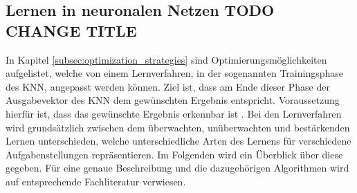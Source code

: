 \subsection{Lernen in neuronalen Netzen TODO CHANGE TITLE}
In Kapitel \ref{subsec:optimization_strategies} sind Optimierungsmöglichkeiten aufgelistet, welche von einem Lernverfahren, in der sogenannten Trainingsphase des \ac{KNN}, angepasst werden können. Ziel ist, dass am Ende dieser Phase der Ausgabevektor des \ac{KNN} dem gewünschten Ergebnis entspricht. Voraussetzung hierfür ist, dass das gewünschte Ergebnis erkennbar ist \cite{zell2003simulation}. Bei den Lernverfahren wird grundsätzlich zwischen dem überwachten, unüberwachten und bestärkenden Lernen unterschieden, welche unterschiedliche Arten des Lernens für verschiedene Aufgabenstellungen repräsentieren. Im Folgenden wird ein Überblick über diese gegeben. Für eine genaue Beschreibung und die dazugehörigen Algorithmen wird auf entsprechende Fachliteratur verwiesen.

